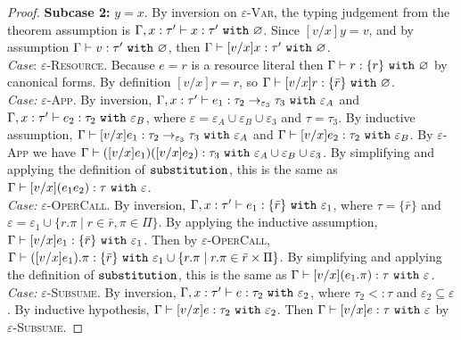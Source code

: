 \begin{appendix}
\begin{proof}
\textbf{Subcase 2:} $y = x$. By inversion on \textsc{$\varepsilon$-Var}, the typing judgement from the theorem assumption is $ \Gamma, x:  \tau' \vdash x:  \tau'~\mathtt{with}~ \varnothing$. Since $[ v/x]y =  v$, and by assumption $ \Gamma \vdash  v:  \tau'~\mathtt{with}~ \varnothing$, then $ \Gamma \vdash [ v/x]x:  \tau'~\mathtt{with}~ \varnothing$. \\

\textit{Case}: \textsc{$\varepsilon$-Resource}. Because $ e = r$ is a resource literal then $ \Gamma \vdash r:  \{ r \}~\mathtt{with}~ \varnothing$ by canonical forms. By definition $[ v/x]r = r$, so $ \Gamma \vdash [ v/x]r:  \{ \bar r\}~\mathtt{with}~ \varnothing$. \\

\textit{Case:} \textsc{$\varepsilon$-App}. By inversion, $ \Gamma, x:  \tau' \vdash  e_1: \tau_2 \rightarrow_{\varepsilon_3}  \tau_3~\mathtt{with}~ \varepsilon_A$ and $ \Gamma, x:  \tau' \vdash  e_2:  \tau_2~\mathtt{with}~ \varepsilon_B$, where $\varepsilon = \varepsilon_A \cup \varepsilon_B \cup \varepsilon_3$ and $ \tau =  \tau_3$. By inductive assumption, $ \Gamma \vdash [ v/x] e_1:  \tau_2 \rightarrow_{\varepsilon_3}  \tau_3~\mathtt{with}~ \varepsilon_A$ and $ \Gamma \vdash [ v/x] e_2:  \tau_2~\mathtt{with}~ \varepsilon_B$. By \textsc{$\varepsilon$-App} we have $ \Gamma \vdash ([ v/x] e_1) ([ v/x] e_2) :  \tau_3~\mathtt{with}~ \varepsilon_A \cup \varepsilon_B \cup \varepsilon_3$. By simplifying and applying the definition of $\mathtt{substitution}$, this is the same as $ \Gamma \vdash [ v/x]( e_1  e_2):  \tau~\mathtt{with}~ \varepsilon$. \\

\textit{Case:} \textsc{$\varepsilon$-OperCall}. By inversion, $ \Gamma, x:  \tau' \vdash  e_1: \{ \bar r \}~\mathtt{with}~ \varepsilon_1$, where $ \tau = \{ \bar r \}$ and $\varepsilon = \varepsilon_1 \cup \{ r.\pi \mid r \in \bar r, \pi \in \Pi \}$. By applying the inductive assumption, $ \Gamma \vdash [ v/x] e_1 : \{ \bar r \} ~\mathtt{with}~ \varepsilon_1$. Then by \textsc{$\varepsilon$-OperCall}, $ \Gamma \vdash ([ v/x] e_1).\pi: \{ \bar r \}~\mathtt{with}~ \varepsilon_1 \cup \{ r.\pi \mid r.\pi \in \bar r \times \Pi \}$. By simplifying and applying the definition of $\mathtt{substitution}$, this is the same as $ \Gamma \vdash [ v/x]( e_1.\pi):  \tau~\mathtt{with}~ \varepsilon$.\\

\textit{Case:} \textsc{$\varepsilon$-Subsume}. By inversion, $ \Gamma, x:  \tau' \vdash  e:  \tau_2~\mathtt{with}~ \varepsilon_2$, where $ \tau_2 <:  \tau$ and $\varepsilon_2 \subseteq \varepsilon$. By inductive hypothesis, $ \Gamma \vdash [ v/x] e:  \tau_2~\mathtt{with}~ \varepsilon_2$. Then $ \Gamma \vdash [ v/x] e:  \tau~\mathtt{with}~ \varepsilon$ by \textsc{$\varepsilon$-Subsume}.


\end{proof}
\end{appendix}
